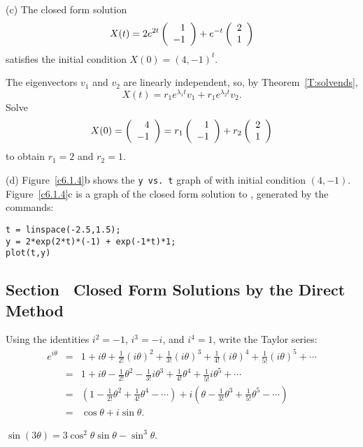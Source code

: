 (c) \ans The closed form solution
\[
X(t) = 2e^{2t}\left(\begin{array}{r} 1 \\ -1\end{array}\right) + e^{-t}\left(\begin{array}{r} 2 \\ 1\end{array}\right)
\]
satisfies the initial condition $X(0) = (4,-1)^t$.

\soln The eigenvectors $v_1$ and $v_2$ are linearly independent, so, by 
Theorem~\ref{T:solvends},
\[
X(t) = r_1e^{\lambda_1t}v_1 + r_1e^{\lambda_2t}v_2.
\]
Solve
\[
X(0) = \left(\begin{array}{r} 4 \\ -1\end{array}\right) = r_1\left(\begin{array}{r} 1 \\ -1\end{array}\right) + r_2\left(\begin{array}{r} 2 \\ 1\end{array}\right)
\]
to obtain $r_1 = 2$ and $r_2 = 1$.

(d) Figure~\ref{c6.1.4}b shows the {\tt y vs.\ t} graph of 
with initial condition $(4,-1)$.  Figure~\ref{c6.1.4}c is a graph of 
the closed form solution to , generated by the \Matlab
commands:
\begin{verbatim}
t = linspace(-2.5,1.5);
y = 2*exp(2*t)*(-1) + exp(-1*t)*1;
plot(t,y)
\end{verbatim}

\begin{figure}[htb]
                       \centerline{%
                       }
\end{figure}



\subsection*{Section~\protect{\ref{S:TDM}} Closed Form Solutions by the Direct
Method}

Using the identities $i^2 = -1$, $i^3 = -i$, and $i^4 = 1$, write
the Taylor series:
\[
\begin{array}{rcl}
e^{i\theta} & = & 1 + i\theta + \frac{1}{2!}(i\theta)^2 +
\frac{1}{3!}(i\theta)^3 + \frac{1}{4!}(i\theta)^4 +
\frac{1}{5!}(i\theta)^5 + \cdots \\
& = & 1 + i\theta - \frac{1}{2!}\theta^2 - \frac{1}{3!}i\theta^3 +
\frac{1}{4!}\theta^4 + \frac{1}{5!}i\theta^5 + \cdots \\
& = & (1 - \frac{1}{2!}\theta^2 + \frac{1}{4!}\theta^4 - \cdots)
+ i(\theta - \frac{1}{3!}\theta^3 + \frac{1}{5!}\theta^5 - \cdots) \\
& = & \cos\theta + i\sin\theta. \end{array}
\]

\ans $\sin(3\theta) = 3\cos^2\theta\sin\theta - \sin^3\theta$.

